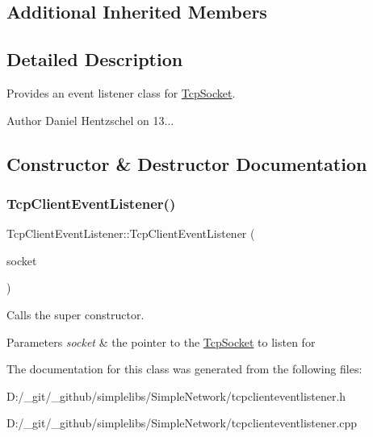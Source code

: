 \subsection*{Additional Inherited Members}


\subsection{Detailed Description}
Provides an event listener class for \mbox{\hyperlink{class_tcp_socket}{Tcp\+Socket}}. 

\begin{DoxyAuthor}{Author}
Daniel Hentzschel on 13... 
\end{DoxyAuthor}


\subsection{Constructor \& Destructor Documentation}
\mbox{\label{class_tcp_client_event_listener_aec59e53888849d543205bc501743e2ab}} 
\subsubsection{\texorpdfstring{TcpClientEventListener()}{TcpClientEventListener()}}
{\footnotesize\ttfamily Tcp\+Client\+Event\+Listener\+::\+Tcp\+Client\+Event\+Listener (\begin{DoxyParamCaption}\item[{\mbox{\hyperlink{class_tcp_socket}{Tcp\+Socket}} $\ast$}]{socket }\end{DoxyParamCaption})\hspace{0.3cm}{\ttfamily [explicit]}}



Calls the super constructor. 


\begin{DoxyParams}{Parameters}
{\em socket} & the pointer to the \mbox{\hyperlink{class_tcp_socket}{Tcp\+Socket}} to listen for \\
\hline
\end{DoxyParams}


The documentation for this class was generated from the following files\+:\begin{DoxyCompactItemize}
\item 
D\+:/\+\_\+git/\+\_\+github/simplelibs/\+Simple\+Network/tcpclienteventlistener.\+h\item 
D\+:/\+\_\+git/\+\_\+github/simplelibs/\+Simple\+Network/tcpclienteventlistener.\+cpp\end{DoxyCompactItemize}
